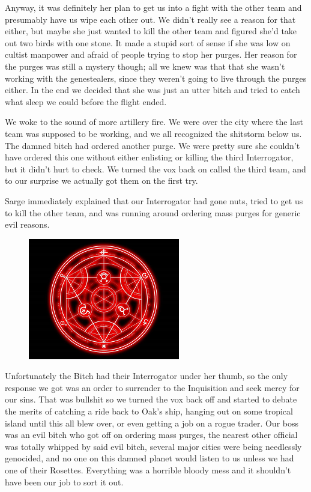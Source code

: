 Anyway, it was definitely her plan to get us into a fight with the other team and presumably have us wipe each other out. 
We didn’t really see a reason for that either, but maybe she just wanted to kill the other team and figured she’d take out two birds with one stone. 
It made a stupid sort of sense if she was low on cultist manpower and afraid of people trying to stop her purges. 
Her reason for the purges was still a mystery though; 
all we knew was that that she wasn’t working with the genestealers, since they weren’t going to live through the purges either. 
In the end we decided that she was just an utter bitch and tried to catch what sleep we could before the flight ended. 

We woke to the sound of more artillery fire. 
We were over the city where the last team was supposed to be working, and we all recognized the shitstorm below us. 
The damned bitch had ordered another purge. 
We were pretty sure she couldn’t have ordered this one without either enlisting or killing the third Interrogator, but it didn’t hurt to check. 
We turned the vox back on called the third team, and to our surprise we actually got them on the first try.

Sarge immediately explained that our Interrogator had gone nuts, tried to get us to kill the other team, and was running around ordering mass purges for generic evil reasons.

\begin{figure}
	\begin{center}
		\includegraphics[width=\figwidth]{pics/5/27.png}
	\end{center}
\end{figure}
Unfortunately the Bitch had their Interrogator under her thumb, so the only response we got was an order to surrender to the Inquisition and seek mercy for our sins. 
That was bullshit so we turned the vox back off and started to debate the merits of catching a ride back to Oak’s ship, hanging out on some tropical island until this all blew over, or even getting a job on a rogue trader. 
Our boss was an evil bitch who got off on ordering mass purges, the nearest other official was totally whipped by said evil bitch, several major cities were being needlessly genocided, and no one on this damned planet would listen to us unless we had one of their Rosettes. 
Everything was a horrible bloody mess and it shouldn’t have been our job to sort it out.

